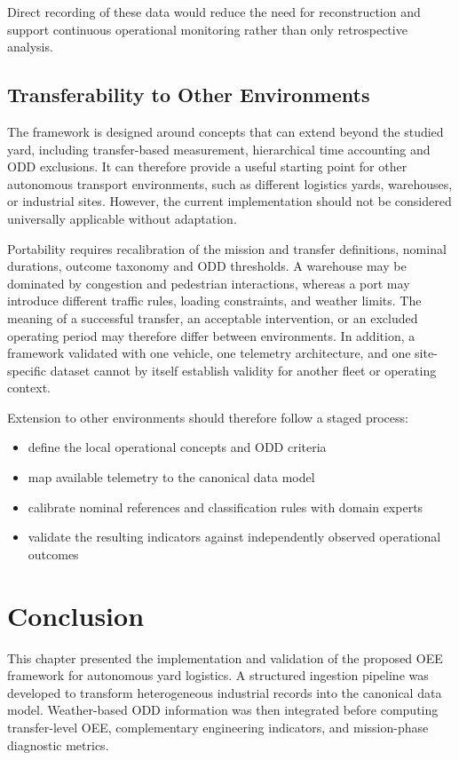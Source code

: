 Direct recording of these data would reduce the need for reconstruction and support continuous operational monitoring rather than only retrospective analysis.

\subsection{Transferability to Other Environments}
The framework is designed around concepts that can extend beyond the studied yard, including transfer-based measurement, hierarchical time accounting and ODD exclusions. It can therefore provide a useful starting point for other autonomous transport environments, such as different logistics yards, warehouses, or industrial sites. However, the current implementation should not be considered universally applicable without adaptation.

Portability requires recalibration of the mission and transfer definitions, nominal durations, outcome taxonomy and ODD thresholds. A warehouse may be dominated by congestion and pedestrian interactions, whereas a port may introduce different traffic rules, loading constraints, and weather limits. The meaning of a successful transfer, an acceptable intervention, or an excluded operating period may therefore differ between environments. In addition, a framework validated with one vehicle, one telemetry architecture, and one site-specific dataset cannot by itself establish validity for another fleet or operating context.

Extension to other environments should therefore follow a staged process: 
\begin{itemize}
    \item define the local operational concepts and ODD criteria
    \item map available telemetry to the canonical data model
    \item calibrate nominal references and classification rules with domain experts
    \item validate the resulting indicators against independently observed operational outcomes
\end{itemize}
\section{Conclusion}
This chapter presented the implementation and validation of the proposed OEE framework for autonomous yard logistics. A structured ingestion pipeline was developed to transform heterogeneous industrial records into the canonical data model. Weather-based ODD information was then integrated before computing transfer-level OEE, complementary engineering indicators, and mission-phase diagnostic metrics.

